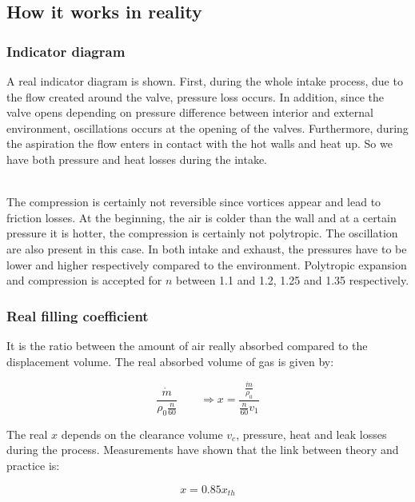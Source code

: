 \subsection{How it works in reality}
\subsubsection{Indicator diagram}

A real indicator diagram is shown. First, during the whole intake process, due to the flow created around the valve, pressure loss occurs. In addition, since the valve opens depending on pressure difference between interior and external environment, oscillations occurs at the opening of the valves. Furthermore, during the aspiration the flow enters in contact with the hot walls and heat up. So we have both pressure and heat losses during the intake. 

\ \\
The compression is certainly not reversible since vortices appear and lead to friction losses. At the beginning, the air is colder than the wall and at a certain pressure it is hotter, the compression is certainly not polytropic. The oscillation are also present in this case. In both intake and exhaust, the pressures have to be lower and higher respectively compared to the environment. Polytropic expansion and compression is accepted for $n$ between 1.1 and 1.2, 1.25 and 1.35 respectively. 

\subsubsection{Real filling coefficient}
It is the ratio between the amount of air really absorbed compared to the displacement volume. The real absorbed volume of gas is given by: 

\begin{equation}
\frac{\dot{m}}{\rho _0 \frac{n}{60}} \qquad \Rightarrow x = \frac{\frac{\dot{m}}{\rho_0}}{\frac{n}{60}v_1}
\end{equation} 	

The real $x$ depends on the clearance volume $v_c$, pressure, heat and leak losses during the process. Measurements have shown that the link between theory and practice is: 

\begin{equation}
x = 0.85 x_{th}
\end{equation}